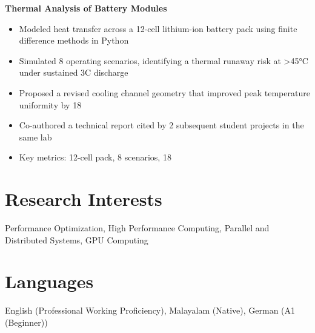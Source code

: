 \documentclass[11pt,a4paper]{article}
\begin{document}
\textbf{ Thermal Analysis of Battery Modules }
\begin{itemize}[leftmargin=*,nosep,topsep=2pt]
    
    \item Modeled heat transfer across a 12-cell lithium-ion battery pack using finite difference methods in Python
    
    \item Simulated 8 operating scenarios, identifying a thermal runaway risk at >45°C under sustained 3C discharge
    
    \item Proposed a revised cooling channel geometry that improved peak temperature uniformity by 18%
    
    \item Co-authored a technical report cited by 2 subsequent student projects in the same lab
    
    \item Key metrics: 12-cell pack, 8 scenarios, 18%
    
\end{itemize}


\section{Research Interests}
Performance Optimization, High Performance Computing, Parallel and Distributed Systems, GPU Computing

\section{Languages}
English (Professional Working Proficiency), Malayalam (Native), German (A1 (Beginner))
\end{document}
